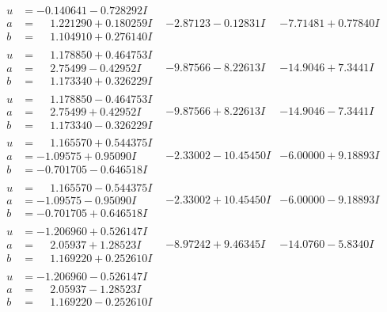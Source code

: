 \documentclass[1p]{elsarticle_modified}
\theoremstyle{definition}
\begin{document}
$$\begin{array}{c|c|c}
\begin{aligned}
u &= -0.140641 - 0.728292 I \\
a &= \phantom{-}1.221290 + 0.180259 I \\
b &= \phantom{-}1.104910 + 0.276140 I\end{aligned}
 & -2.87123 - 0.12831 I & -7.71481 + 0.77840 I \\ \hline\begin{aligned}
u &= \phantom{-}1.178850 + 0.464753 I \\
a &= \phantom{-}2.75499 - 0.42952 I \\
b &= \phantom{-}1.173340 + 0.326229 I\end{aligned}
 & -9.87566 - 8.22613 I & -14.9046 + 7.3441 I \\ \hline\begin{aligned}
u &= \phantom{-}1.178850 - 0.464753 I \\
a &= \phantom{-}2.75499 + 0.42952 I \\
b &= \phantom{-}1.173340 - 0.326229 I\end{aligned}
 & -9.87566 + 8.22613 I & -14.9046 - 7.3441 I \\ \hline\begin{aligned}
u &= \phantom{-}1.165570 + 0.544375 I \\
a &= -1.09575 + 0.95090 I \\
b &= -0.701705 - 0.646518 I\end{aligned}
 & -2.33002 - 10.45450 I & -6.00000 + 9.18893 I \\ \hline\begin{aligned}
u &= \phantom{-}1.165570 - 0.544375 I \\
a &= -1.09575 - 0.95090 I \\
b &= -0.701705 + 0.646518 I\end{aligned}
 & -2.33002 + 10.45450 I & -6.00000 - 9.18893 I \\ \hline\begin{aligned}
u &= -1.206960 + 0.526147 I \\
a &= \phantom{-}2.05937 + 1.28523 I \\
b &= \phantom{-}1.169220 + 0.252610 I\end{aligned}
 & -8.97242 + 9.46345 I & -14.0760 - 5.8340 I \\ \hline\begin{aligned}
u &= -1.206960 - 0.526147 I \\
a &= \phantom{-}2.05937 - 1.28523 I \\
b &= \phantom{-}1.169220 - 0.252610 I\end{aligned}

\end{array}$$
\end{document}
